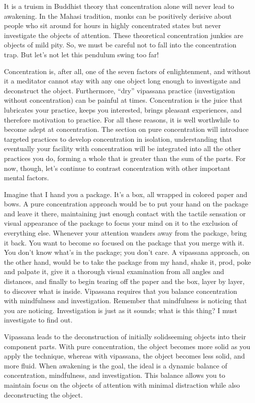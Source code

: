 \documentclass[a5paper,10pt,english]{book}
\begin{document}
\sphinxAtStartPar
It is a truism in Buddhist theory that concentration alone will never
lead to awakening. In the Mahasi tradition, monks can be positively
derisive about people who sit around for hours in highly concentrated
states but never investigate the objects of attention. These theoretical
concentration junkies are objects of mild pity. So, we must be careful
not to fall into the concentration trap. But let’s not let this pendulum
swing too far!

\sphinxAtStartPar
Concentration is, after all, one of the seven factors of enlightenment,
and without it a meditator cannot stay with any one object long enough
to investigate and deconstruct the object. Furthermore, “dry” vipassana
practice (investigation without concentration) can be painful at times.
Concentration is the juice that lubricates your practice, keeps you
interested, brings pleasant experiences, and therefore motivation to
practice. For all these reasons, it is well worthwhile to become adept
at concentration. The section on pure concentration will introduce
targeted practices to develop concentration in isolation, understanding
that eventually your facility with concentration will be integrated into
all the other practices you do, forming a whole that is greater than the
sum of the parts. For now, though, let’s continue to contrast
concentration with other important mental factors.

\sphinxAtStartPar
Imagine that I hand you a package. It’s a box, all wrapped in colored
paper and bows. A pure concentration approach would be to put your hand
on the package and leave it there, maintaining just enough contact with
the tactile sensation or visual appearance of the package to focus your
mind on it to the exclusion of everything else. Whenever your attention
wanders away from the package, bring it back. You want to become so
focused on the package that you merge with it. You don’t know what’s in
the package; you don’t care. A vipassana approach, on the other hand,
would be to take the package from my hand, shake it, prod, poke and
palpate it, give it a thorough visual examination from all angles and
distances, and finally to begin tearing off the paper and the box, layer
by layer, to discover what is inside. Vipassana requires that you
balance concentration with mindfulness and investigation. Remember that
mindfulness is noticing that you are noticing. Investigation is just as
it sounds; what is this thing? I must investigate to find out.

\sphinxAtStartPar
Vipassana leads to the deconstruction of initially solid\sphinxhyphen{}seeming objects
into their component parts. With pure concentration, the object becomes
more solid as you apply the technique, whereas with vipassana, the
object becomes less solid, and more fluid. When awakening is the goal,
the ideal is a dynamic balance of concentration, mindfulness, and
investigation. This balance allows you to maintain focus on the objects
of attention with minimal distraction while also deconstructing the
object.
\end{document}
